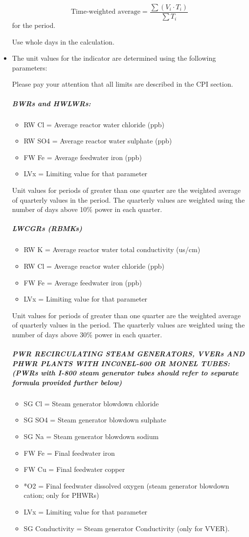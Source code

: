 \begin{itemize}
$$ \text{Time-weighted average} = \frac{\sum{(V_i \cdot T_i)}}{\sum{T_i}} $$
for the period.

Use whole days in the calculation.

\item The unit values for the indicator are determined using the
  following parameters:

Please pay your attention that all limits are described in the CPI
section.
\subparagraph{BWRs and HWLWRs:}
\begin{itemize}
\item RW Cl		=	Average reactor water chloride (ppb)
\item RW SO4	=	Average reactor water sulphate (ppb)
\item FW Fe		=	Average feedwater iron (ppb)
\item LVx		=	Limiting value for that parameter
\end{itemize}

Unit values for periods of greater than one quarter are the weighted
average of quarterly values in the period. The quarterly values are
weighted using the number of days above 10\% power in each quarter.

\subparagraph{LWCGRs (RBMKs)}
\begin{itemize}
\item RW K		=	Average reactor water total conductivity (us/cm)
\item RW Cl		=	Average reactor water chloride (ppb)
\item FW Fe		=	Average feedwater iron (ppb)
\item LVx		=	Limiting value for that parameter
\end{itemize}

Unit values for periods of greater than one quarter are the weighted
average of quarterly values in the period. The quarterly values are
weighted using the number of days above 30\% power in each quarter.

\subparagraph{PWR RECIRCULATING STEAM GENERATORS, VVERs AND PHWR
  PLANTS WITH INC0NEL-600 OR MONEL TUBES:  (PWRs with I-800 steam
  generator tubes should refer to separate formula provided further
  below)}
\begin{itemize}
\item SG Cl		=	Steam generator blowdown chloride
\item SG SO4		=	Steam generator blowdown sulphate
\item SG Na		=	Steam generator blowdown sodium
\item FW Fe		=	Final feedwater iron
\item FW Cu		=	Final feedwater copper
\item *O2		=	Final feedwater dissolved oxygen (steam generator blowdown cation; only for PHWRs)
\item LVx		=	Limiting value for that parameter
\item SG Conductivity = 	Steam generator Conductivity (only for
  VVER).
\end{itemize}


\end{itemize}
